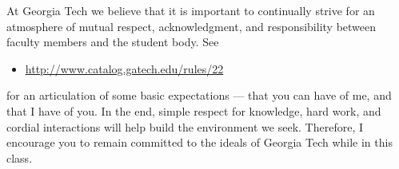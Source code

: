         At Georgia Tech we believe that it is important to continually strive for an atmosphere of mutual respect, acknowledgment, and responsibility between faculty members and the student body. See 
        \begin{itemize}
            \item \url{http://www.catalog.gatech.edu/rules/22}
        \end{itemize} 
        for an articulation of some basic expectations --- that you can have of me, and that I have of you. In the end, simple respect for knowledge, hard work, and cordial interactions will help build the environment we seek. Therefore, I encourage you to remain committed to the ideals of Georgia Tech while in this class.
